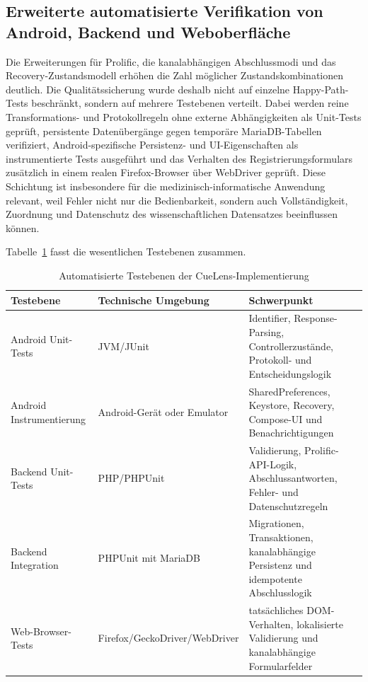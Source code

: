 
\begin{neu}
\section{Erweiterte automatisierte Verifikation von Android, Backend und Weboberfläche}

Die Erweiterungen für Prolific, die kanalabhängigen Abschlussmodi und das Recovery-Zustandsmodell erhöhen die Zahl möglicher Zustandskombinationen deutlich. Die Qualitätssicherung wurde deshalb nicht auf einzelne Happy-Path-Tests beschränkt, sondern auf mehrere Testebenen verteilt. Dabei werden reine Transformations- und Protokollregeln ohne externe Abhängigkeiten als Unit-Tests geprüft, persistente Datenübergänge gegen temporäre MariaDB-Tabellen verifiziert, Android-spezifische Persistenz- und UI-Eigenschaften als instrumentierte Tests ausgeführt und das Verhalten des Registrierungsformulars zusätzlich in einem realen Firefox-Browser über WebDriver geprüft. Diese Schichtung ist insbesondere für die medizinisch-informatische Anwendung relevant, weil Fehler nicht nur die Bedienbarkeit, sondern auch Vollständigkeit, Zuordnung und Datenschutz des wissenschaftlichen Datensatzes beeinflussen können.

Tabelle~\ref{tab:automated-test-layers} fasst die wesentlichen Testebenen zusammen.

\begin{table}[htbp]
\centering
\caption{Automatisierte Testebenen der CueLens-Implementierung}
\label{tab:automated-test-layers}
\begin{tabular}{p{}p{}p{}}
\textbf{Testebene} & \textbf{Technische Umgebung} & \textbf{Schwerpunkt} \\
\hline
Android Unit-Tests & JVM/JUnit & Identifier, Response-Parsing, Controllerzustände, Protokoll- und Entscheidungslogik \\
Android Instrumentierung & Android-Gerät oder Emulator & SharedPreferences, Keystore, Recovery, Compose-UI und Benachrichtigungen \\
Backend Unit-Tests & PHP/PHPUnit & Validierung, Prolific-API-Logik, Abschlussantworten, Fehler- und Datenschutzregeln \\
Backend Integration & PHPUnit mit MariaDB & Migrationen, Transaktionen, kanalabhängige Persistenz und idempotente Abschlusslogik \\
Web-Browser-Tests & Firefox/GeckoDriver/WebDriver & tatsächliches DOM-Verhalten, lokalisierte Validierung und kanalabhängige Formularfelder \\
\end{tabular}
\end{table}


\end{neu}
